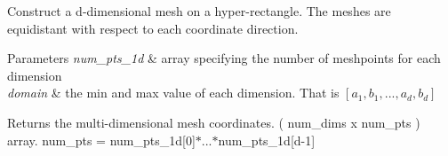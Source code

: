 Construct a d-\/dimensional mesh on a hyper-\/rectangle. The meshes are equidistant with respect to each coordinate direction. 


\begin{DoxyParams}{Parameters}
{\em num\+\_\+pts\+\_\+1d} & array specifying the number of meshpoints for each dimension \\
\hline
{\em domain} & the min and max value of each dimension. That is $ [a_1,b_1,...,a_d,b_d]$ \\
\hline
\end{DoxyParams}
\begin{DoxyReturn}{Returns}
the multi-\/dimensional mesh coordinates. ( num\+\_\+dims x num\+\_\+pts ) array. num\+\_\+pts = num\+\_\+pts\+\_\+1d\mbox{[}0\mbox{]}$\ast$...$\ast$num\+\_\+pts\+\_\+1d\mbox{[}d-\/1\mbox{]} 
\end{DoxyReturn}
